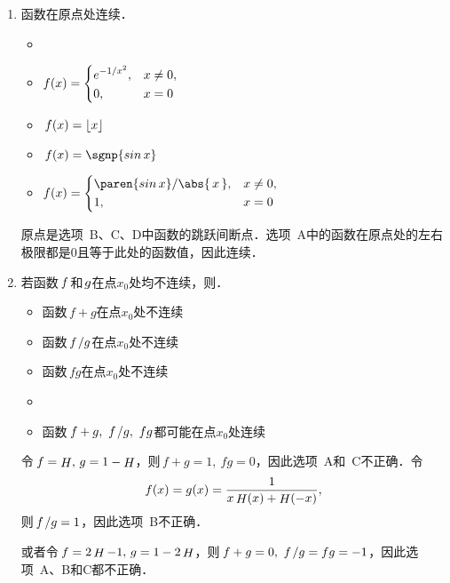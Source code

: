 \begin{enumerate}
\item 函数\uline{\makebox[10em]{}}在原点处连续．
  \begin{itemize}
    \renewcommand{\labelitemi}{\faCircleThin}
    \ifshowsol
    \item[\faCircle]
    \else
    \item
    \fi
    \begin{math}
      f(x) =
      \begin{dcases}
        e^{-1/x^2}, & x \ne 0, \\
        0, & x = 0
      \end{dcases}
    \end{math}
  \item \(\,f(x) = \lfloor x\rfloor\)
  \item \(\,f(x) = \sgnp{\sin x}\)
  \item
    \begin{math}
      f(x) =
      \begin{dcases}
        \paren{\sin x}/\abs{\,x\,}, & x \ne 0, \\
        1, & x = 0
      \end{dcases}
    \end{math}
  \end{itemize}

  \ifshowsol
    原点是选项~B、C、D中函数的跳跃间断点．选项~A中的函数在原点处的左右极限都是\(0\)且等于此处的函数值，因此连续．
  \fi

\item 若函数\(\,f\mkern2mu\)和\(\mkern2mu g\)在点\(x_0\)处均不连续，则\uline{\makebox[10em]{}}．
  \begin{itemize}
    \renewcommand{\labelitemi}{\faCircleThin}
  \item 函数\(\,f+g\)在点\(x_0\)处不连续
  \item 函数\(\,f\mkern2mu/g\)在点\(x_0\)处不连续
  \item 函数\(\,fg\)在点\(x_0\)处不连续
    \ifshowsol
    \item[\faCircle]
    \else
    \item
    \fi
    函数\(\,f+g,\ f\mkern2mu/g,\ fg\)都可能在点\(x_0\)处连续
  \end{itemize}

  \ifshowsol
    令\(\,f = \mathop{\relax H}\nolimits,\, g = 1-\mathop{\relax H}\nolimits\)，则\(\,f + g = 1,\ fg = 0\)，因此选项~A和~C不正确．令
    \begin{equation*}
      f(x) = g(x) = \frac{1}{x \mathop{\relax H}\nolimits(x) + \mathop{\relax H}\nolimits(-x)},
    \end{equation*}
    则\(\,f\mkern2mu/g = 1\)，因此选项~B不正确．

    或者令\(\,f = 2\mathop{\relax H}\nolimits - 1,\, g = 1 - 2\mathop{\relax H}\nolimits\)，则\(\,f + g = 0,\ f\mkern2mu/g = fg = -1\)，因此选项~A、B和C都不正确．
  \fi
\end{enumerate}
\fi

